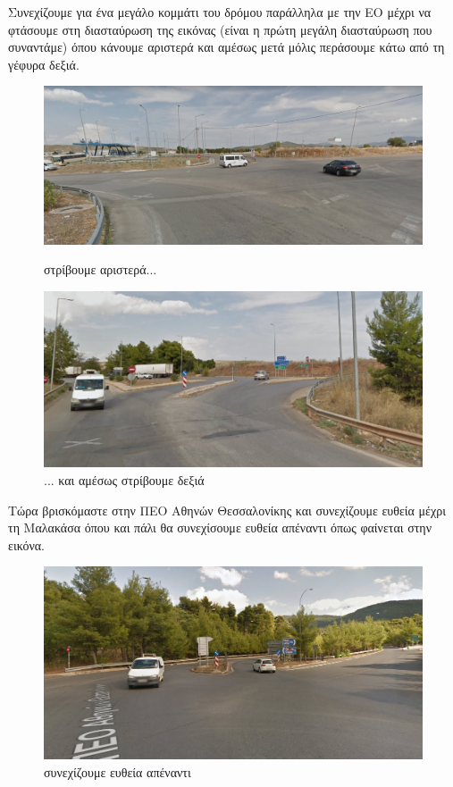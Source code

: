 Συνεχίζουμε για ένα μεγάλο κομμάτι του δρόμου παράλληλα με την ΕΟ μέχρι να φτάσουμε στη διασταύρωση της εικόνας (είναι η πρώτη μεγάλη διασταύρωση που συναντάμε) όπου κάνουμε αριστερά και αμέσως μετά μόλις περάσουμε κάτω από τη γέφυρα δεξιά.
\begin{figure}[H]
\includegraphics[width=\textwidth]{images/lamia-athina/afidnon/afidnon_022.jpg} 
\caption{στρίβουμε αριστερά...}
\includegraphics[width=\textwidth]{images/lamia-athina/afidnon/afidnon_023.jpg} 
\caption{... και αμέσως στρίβουμε δεξιά}
\end{figure}
Τώρα βρισκόμαστε στην ΠΕΟ Αθηνών Θεσσαλονίκης και συνεχίζουμε ευθεία μέχρι τη Μαλακάσα όπου και πάλι θα συνεχίσουμε ευθεία απέναντι όπως φαίνεται στην εικόνα.
\begin{figure}[H]
\includegraphics[width=\textwidth]{images/lamia-athina/afidnon/afidnon_024.jpg} 
\caption{συνεχίζουμε ευθεία απέναντι}
\end{figure}
